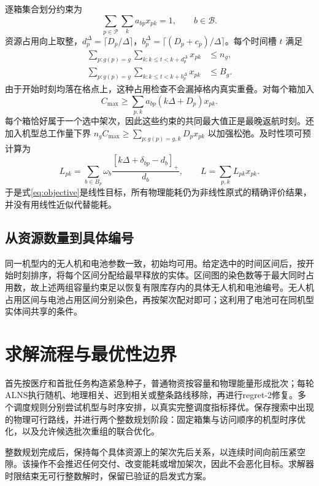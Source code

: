 \documentclass[a4paper,11pt]{article}
\newcommand{\pos}[1]{\left[#1\right]_+}
\begin{document}
逐箱集合划分约束为
\begin{equation}
 \sum_{p\in\mathcal P}\sum_k a_{bp}x_{pk}=1,\qquad b\in\mathcal B.
\end{equation}
资源占用向上取整，$d_p^\Delta=\lceil D_p/\Delta\rceil$，$b_p^\Delta=\lceil(D_p+c_p)/\Delta\rceil$。每个时间槽 $t$ 满足
\begin{align}
 \sum_{p:g(p)=g}\sum_{k:k\le t<k+d_p^\Delta}x_{pk}&\le n_g,\\
 \sum_{p:g(p)=g}\sum_{k:k\le t<k+b_p^\Delta}x_{pk}&\le B_g.
\end{align}
由于开始时刻均落在格点上，这种占用检查不会漏掉格内真实重叠。对每个箱加入
\begin{equation}
 C_{\max}\ge\sum_{p,k}a_{bp}(k\Delta+D_p)x_{pk}.
\end{equation}
每个箱恰好属于一个选中架次，因此这些约束的共同最大值正是最晚返航时刻。还加入机型总工作量下界 $n_gC_{\max}\ge\sum_{p:g(p)=g,k}D_px_{pk}$ 以加强松弛。及时性项可预计算为
\begin{equation}
 L_{pk}=\sum_{b\in B_p}\omega_b\frac{\pos{k\Delta+\delta_{bp}-d_b}}{d_b},\qquad
 L=\sum_{p,k}L_{pk}x_{pk}.
\end{equation}
于是式\eqref{eq:objective}是线性目标，所有物理能耗仍为非线性原式的精确评价结果，并没有用线性近似代替能耗。

\subsection{从资源数量到具体编号}
同一机型内的无人机和电池参数一致，初始均可用。给定选中的时间区间后，按开始时刻排序，将每个区间分配给最早释放的实体。区间图的染色数等于最大同时占用数，故上述两组容量约束足以恢复有限库存内的具体无人机和电池编号。无人机占用区间与电池占用区间分别染色，再按架次配对即可；这利用了电池可在同机型实体间共享的条件。

\section{求解流程与最优性边界}
首先按医疗和首批任务构造紧急种子，普通物资按容量和物理能量形成批次；每轮ALNS执行随机、地理相关、迟到相关或整条路线移除，再进行regret-2修复。多个调度规则分别尝试机型与时序安排，以真实完整调度指标择优。保存搜索中出现的物理可行路线，并进行两个整数规划阶段：固定箱集与访问顺序的机型时序优化，以及允许候选批次重组的联合优化。

整数规划完成后，保持每个具体资源上的架次先后关系，以连续时间向前压紧空隙。该操作不会推迟任何交付、改变能耗或增加架次，因此不会恶化目标。求解器时限结束无可行整数解时，保留已验证的启发式方案。
\end{document}
